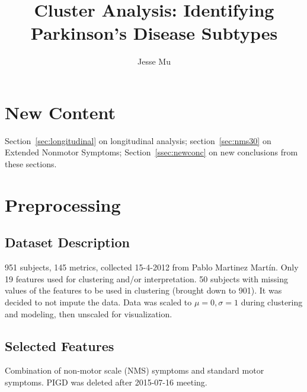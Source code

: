 \documentclass[10pt]{article}
\begin{document}
\title{Cluster Analysis: Identifying Parkinson's Disease Subtypes}
\author{Jesse Mu}
\maketitle

\tableofcontents
\newpage

\begin{multicols}{2}

\section{New Content}

Section~\ref{sec:longitudinal} on longitudinal analysis; section~\ref{sec:nms30} on Extended
Nonmotor Symptoms; Section~\ref{ssec:newconc} on new conclusions from these sections.

\section{Preprocessing}

\subsection{Dataset Description}
951 subjects, 145 metrics, collected 15-4-2012 from Pablo Martinez Mart\'in. Only
19 features used for clustering and/or interpretation.  50 subjects with
missing values of the features to be used in clustering (brought down to 901).
It was decided to not impute the data. Data was scaled to $\mu = 0, \sigma =
1$ during clustering and modeling, then unscaled for visualization.

\subsection{Selected Features}

Combination of non-motor scale (NMS) symptoms and standard motor symptoms.
PIGD was deleted after 2015-07-16 meeting.


\end{multicols}
\end{document}
